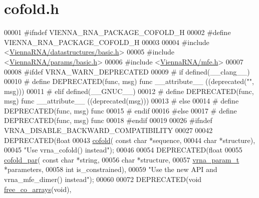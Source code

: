 \hypertarget{cofold_8h_source}{}\section{cofold.\+h}
\label{cofold_8h_source}

\begin{DoxyCode}
00001 \textcolor{preprocessor}{#ifndef VIENNA\_RNA\_PACKAGE\_COFOLD\_H}
00002 \textcolor{preprocessor}{#define VIENNA\_RNA\_PACKAGE\_COFOLD\_H}
00003 
00004 \textcolor{preprocessor}{#include <\hyperlink{datastructures_2basic_8h}{ViennaRNA/datastructures/basic.h}>}
00005 \textcolor{preprocessor}{#include <\hyperlink{params_2basic_8h}{ViennaRNA/params/basic.h}>}
00006 \textcolor{preprocessor}{#include <\hyperlink{mfe_8h}{ViennaRNA/mfe.h}>}
00007 
00008 \textcolor{preprocessor}{#ifdef VRNA\_WARN\_DEPRECATED}
00009 \textcolor{preprocessor}{# if defined(\_\_clang\_\_)}
00010 \textcolor{preprocessor}{#  define DEPRECATED(func, msg) func \_\_attribute\_\_ ((deprecated("", msg)))}
00011 \textcolor{preprocessor}{# elif defined(\_\_GNUC\_\_)}
00012 \textcolor{preprocessor}{#  define DEPRECATED(func, msg) func \_\_attribute\_\_ ((deprecated(msg)))}
00013 \textcolor{preprocessor}{# else}
00014 \textcolor{preprocessor}{#  define DEPRECATED(func, msg) func}
00015 \textcolor{preprocessor}{# endif}
00016 \textcolor{preprocessor}{#else}
00017 \textcolor{preprocessor}{# define DEPRECATED(func, msg) func}
00018 \textcolor{preprocessor}{#endif}
00019 
00026 \textcolor{preprocessor}{#ifndef VRNA\_DISABLE\_BACKWARD\_COMPATIBILITY}
00027 
00042 DEPRECATED(\textcolor{keywordtype}{float}
00043 \hyperlink{group__mfe__global__deprecated_gabc8517f22cfe70595ee81fc837910d52}{cofold}( \textcolor{keyword}{const} \textcolor{keywordtype}{char} *sequence,
00044         \textcolor{keywordtype}{char} *structure),
00045         \textcolor{stringliteral}{"Use vrna\_cofold() instead"});
00046 
00054 DEPRECATED(\textcolor{keywordtype}{float}
00055 \hyperlink{group__mfe__global__deprecated_ga7612cfeeb1b793f1e4179b1eb53df1f3}{cofold\_par}( \textcolor{keyword}{const} \textcolor{keywordtype}{char} *\textcolor{keywordtype}{string},
00056             \textcolor{keywordtype}{char} *structure,
00057             \hyperlink{group__energy__parameters_structvrna__param__s}{vrna\_param\_t} *parameters,
00058             \textcolor{keywordtype}{int} is\_constrained),
00059             \textcolor{stringliteral}{"Use the new API and vrna\_mfe\_dimer() instead"});
00060 
00072 DEPRECATED(\textcolor{keywordtype}{void} \hyperlink{group__mfe__global__deprecated_gaafb33d7473eb9af9d1b168ca8761c41a}{free\_co\_arrays}(\textcolor{keywordtype}{void}),

\end{DoxyCode}
